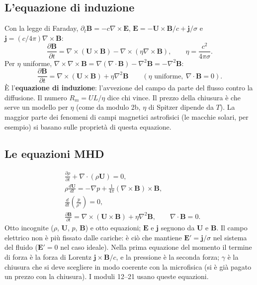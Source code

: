 \subsection{L'equazione di induzione}
Con la legge di Faraday, $\partial_t\mathbf{B}=-c\nabla\times\mathbf{E}$, $\mathbf{E}=-\mathbf{U}\times\mathbf{B}/c+\mathbf{j}/\sigma$ e $\mathbf{j}=(c/4\pi)\nabla\times\mathbf{B}$:
\begin{equation}
\frac{\partial\mathbf{B}}{\partial t}=\nabla\times(\mathbf{U}\times\mathbf{B})-\nabla\times(\eta\nabla\times\mathbf{B}),\qquad\eta=\frac{c^2}{4\pi\sigma}.
\end{equation}
Per $\eta$ uniforme, $\nabla\times\nabla\times\mathbf{B}=\nabla(\nabla\cdot\mathbf{B})-\nabla^2\mathbf{B}=-\nabla^2\mathbf{B}$:
\begin{equation}
\frac{\partial\mathbf{B}}{\partial t}=\nabla\times(\mathbf{U}\times\mathbf{B})+\eta\nabla^2\mathbf{B}\qquad(\eta\text{ uniforme},\ \nabla\cdot\mathbf{B}=0).
\end{equation}
È l'\textbf{equazione di induzione}: l'avvezione del campo da parte del flusso contro la diffusione. Il numero $R_m=UL/\eta$ dice chi vince. Il prezzo della chiusura è che serve un modello per $\eta$ (come da modulo 2b, $\eta$ di Spitzer dipende da $T$). La maggior parte dei fenomeni di campi magnetici astrofisici (le macchie solari, per esempio) si basano sulle proprietà di questa equazione.

\subsection{Le equazioni MHD}
\begin{align}
&\frac{\partial\rho}{\partial t}+\nabla\cdot(\rho\mathbf{U})=0,\\
&\rho\frac{d\mathbf{U}}{dt}=-\nabla p+\frac{1}{4\pi}(\nabla\times\mathbf{B})\times\mathbf{B},\\
&\frac{d}{dt}\left(\frac{p}{\rho^\gamma}\right)=0,\\
&\frac{\partial\mathbf{B}}{\partial t}=\nabla\times(\mathbf{U}\times\mathbf{B})+\eta\nabla^2\mathbf{B},\qquad\nabla\cdot\mathbf{B}=0 .
\end{align}
Otto incognite ($\rho$, $\mathbf{U}$, $p$, $\mathbf{B}$) e otto equazioni; $\mathbf{E}$ e $\mathbf{j}$ seguono da $\mathbf{U}$ e $\mathbf{B}$. Il campo elettrico non è più fissato dalle cariche: è ciò che mantiene $\mathbf{E}'=\mathbf{j}/\sigma$ nel sistema del fluido ($\mathbf{E}'=0$ nel caso ideale). Nella prima equazione del momento il termine di forza è la forza di Lorentz $\mathbf{j}\times\mathbf{B}/c$, e la pressione è la seconda forza; $\gamma$ è la chiusura che si deve scegliere in modo coerente con la microfisica (si è già pagato un prezzo con la chiusura). I moduli 12--21 usano queste equazioni.

